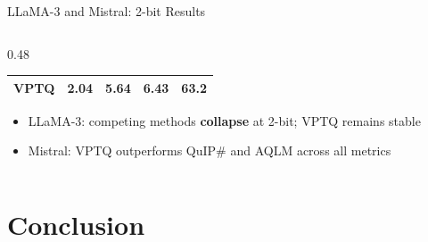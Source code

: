 \begin{frame}{LLaMA-3 and Mistral: 2-bit Results}
\begin{columns}[T]
\begin{column}{0.48\textwidth}
\begin{tabular}{lcccc}
        \rowcolor{mycolor!15}
        \textbf{VPTQ} & 2.04  & \textbf{5.64} & \textbf{6.43} & \textbf{63.2} \\
        \bottomrule
      \end{tabular}
      \vspace{0.7em}
      \begin{itemize}\scriptsize
        \item LLaMA-3: competing methods \textbf{collapse} at 2-bit; VPTQ remains stable
        \item Mistral: VPTQ outperforms QuIP\# and AQLM across all metrics
      \end{itemize}
    \end{column}
  \end{columns}
\end{frame}


\section{Conclusion}

